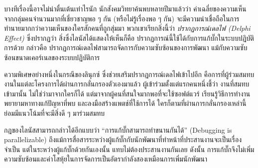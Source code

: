 บางทีเรื่องนี้อาจไม่น่าตื่นเต้นเท่าไรนัก
นักสังคมวิทยาค้นพบหลายปีมาแล้วว่า
ค่าเฉลี่ยของความเห็นจากกลุ่มคนจำนวนมากที่เชี่ยวชาญพอ  ๆ   กัน
(หรือไม่รู้เรื่องพอ  ๆ   กัน)
จะมีความน่าเชื่อถือในการทำนายมากกว่าความเห็นของใครสักคนที่ถูกสุ่มมา
พวกเขาเรียกสิ่งนี้ว่า \emph{ปรากฏการณ์เดลไฟ (Delphi Effect)}
ซึ่งปรากฏว่า สิ่งซึ่งไลนัสได้แสดงให้เห็นก็คือ
ปรากฏการณ์นี้ใช้ได้กับการแก้บั๊กในระบบปฏิบัติการด้วย กล่าวคือ
ปรากฏการณ์เดลไฟสามารถจัดการกับความซับซ้อนของการพัฒนา
แม้กับความซับซ้อนขนาดเคอร์เนลของระบบปฏิบัติการ 

ความพิเศษอย่างหนึ่งในกรณีของลินุกซ์
ซึ่งช่วยเสริมปรากฏการณ์เดลไฟเข้าไปอีก
คือการที่ผู้ร่วมสมทบงานในแต่ละโครงการได้ผ่านการกลั่นกรองตัวเองมาแล้ว
ผู้เข้าร่วมตั้งแต่แรกคนหนึ่งชี้ว่า งานที่สมทบเข้ามานั้น
ไม่ใช่ว่ามาจากใครก็ได้ แต่มาจากผู้คนที่สนใจมากพอที่จะใช้ซอฟต์แวร์
เรียนรู้วิธีการทำงาน พยายามหาทางแก้ปัญหาที่พบ
และลงมือสร้างแพตช์ที่ใช้การได้ ใครก็ตามที่ผ่านการกลั่นกรองเหล่านี้
ย่อมมีแนวโน้มที่จะมีสิ่งดี  ๆ   มาร่วมสมทบ

กฎของไลนัสสามารถกล่าวได้อีกแบบว่า ``การแก้บั๊กสามารถทำขนานกันได้''
(Debu\-g\-ging is parallelizable)
ถึงแม้การสื่อสารระหว่างผู้แก้บั๊กกับนักพัฒนาที่ทำหน้าที่ประสานงานจะเป็นเรื่องจำเป็น
แต่ในระหว่างผู้แก้บั๊กด้วยกันเองนั้น แทบไม่ต้องประสานงานกันเลย ดังนั้น
การแก้บั๊กจึงไม่เพิ่มความซับซ้อนและค่าโสหุ้ยในการจัดการเป็นอัตรากำลังสองเหมือนการเพิ่มนักพัฒนา


